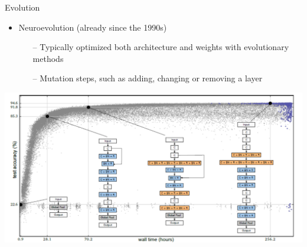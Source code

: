 \begin{frame}[c]{Evolution}
\centering
\begin{itemize}
\item \alert{Neuroevolution} (already since the 1990s)
\begin{itemize}
	\item[--] Typically optimized both architecture and weights with evolutionary methods
	\item[--] Mutation steps, such as adding, changing or removing a layer
\end{itemize}
\end{itemize}
\includegraphics[width=.8\textwidth]{images_lec7/neuroevolution.png}\\
\end{frame}
